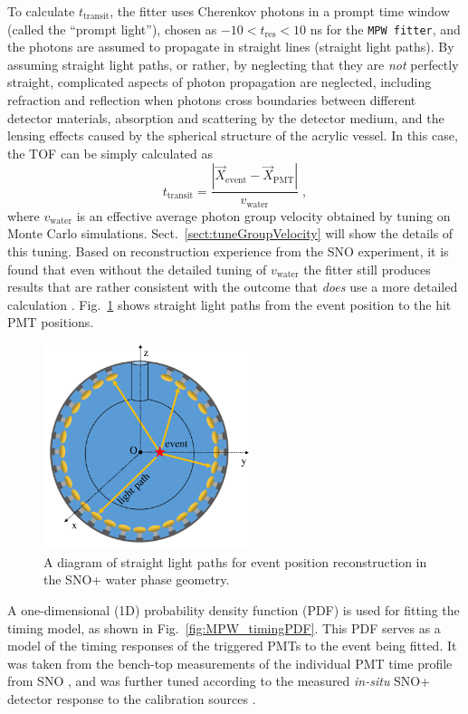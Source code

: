 To calculate $t_{\mathrm{transit}}$, the fitter uses Cherenkov photons in a prompt time window (called the ``prompt light''), chosen as $-10<t_{\mathrm{res}}<10$ ns for the \texttt{MPW fitter}, and the photons are assumed to propagate in straight lines (straight light paths). By assuming straight light paths, or rather, by neglecting that they are {\em not} perfectly straight, complicated aspects of photon propagation are neglected, including refraction and reflection when photons cross boundaries between different detector materials, absorption and scattering by the detector medium, and the lensing effects caused by the spherical structure of the acrylic vessel. In this case, the TOF can be simply calculated as 
\begin{equation*}
t_{\mathrm{transit}}=\frac{|\vec{X}_{\mathrm{event}}-\vec{X}_{\mathrm{PMT}}|}{v_{\mathrm{water}}} \; , 
\end{equation*}
where $v_{\mathrm{water}}$ is an effective average photon group velocity obtained by tuning on Monte Carlo simulations. Sect.~\ref{sect:tuneGroupVelocity} will show the details of this tuning. Based on reconstruction experience from the SNO experiment, it is found that even without the detailed tuning of $v_{\mathrm{water}}$ the fitter still produces results that are rather consistent with the outcome that {\em does} use a more detailed calculation \cite{boulay2004direct,jones2011background}. Fig.~\ref{mpwdiagram_position} shows straight light paths from the event position to the hit PMT positions.
\begin{figure}[htbp]
	\centering
   \includegraphics[width=6cm]{mpwDiagram_coord.png}
	\caption[Straight light path calculation in the water geometry.]{A diagram of straight light paths for event position reconstruction in the SNO+ water phase geometry.}
	\label{mpwdiagram_position}
\end{figure}

A one-dimensional (1D) probability density function (PDF) is used for fitting the timing model, as shown in Fig.~\ref{fig:MPW_timingPDF}. This PDF serves as a model of the timing responses of the triggered PMTs to the event being fitted. It was taken from the bench-top measurements of the individual PMT time profile from SNO \cite{jillings1996photomultiplier}, and was further tuned according to the measured \emph{in-situ} SNO+ detector response to the calibration sources \cite{anderson2021optical}.

